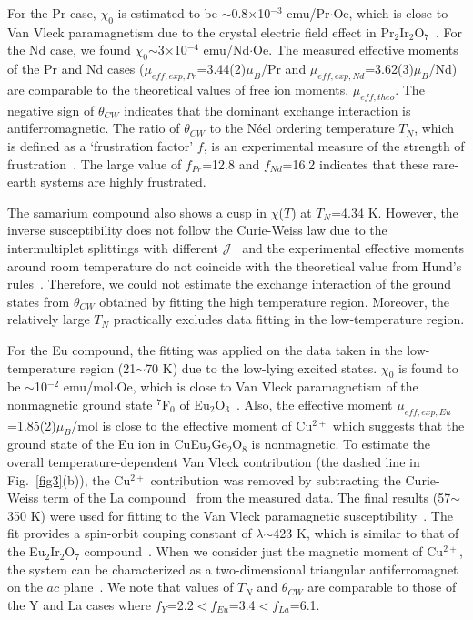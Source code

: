 \documentclass[aps,prl,reprint,amsmath,amssymb,superscriptaddress,showpacs]{revtex4-1}
\begin{document}
For the Pr case, $\chi_0$ is estimated to be $\sim$0.8$\times$10$^{-3}$ emu/Pr$\cdot$Oe, which is close to Van Vleck paramagnetism due to the crystal electric field effect in Pr$_2$Ir$_2$O$_7$~\cite{S.Nakatsuji2006}. For the Nd case, we found $\chi_0$$\sim$3$\times$10$^{-4}$ emu/Nd$\cdot$Oe. The measured effective moments of the Pr and Nd cases ($\mu_{eff,exp,Pr}$=3.44(2)$\mu_{B}$/Pr and $\mu_{eff,exp,Nd}$=3.62(3)$\mu_{B}$/Nd)  are comparable to the theoretical values of free ion moments, $\mu_{eff,theo}$. The negative sign of $\theta_{CW}$ indicates that the dominant exchange interaction is antiferromagnetic. The ratio of $\theta_{CW}$ to the N\'eel ordering temperature $T_N$, which is defined as a `frustration factor' $f$, is an experimental measure of the strength of frustration~\cite{A.Ramirez1994}. The large value of $f_{Pr}$=12.8 and $f_{Nd}$=16.2 indicates that these rare-earth systems are highly frustrated.  

The samarium compound also shows a cusp in $\chi$($T$) at $T_N$=4.34 K. However, the inverse susceptibility does not follow the Curie-Weiss law due to the intermultiplet splittings with different $\mathcal{J}$~\cite{S.Singh2008,J.pospisil2010} and the experimental effective moments around room temperature do not coincide with the theoretical value from Hund's rules~\cite{S.Blundell2001}. Therefore, we could not estimate the exchange interaction of the ground states from $\theta_{CW}$ obtained by fitting the high temperature region. Moreover, the relatively large $T_N$ practically excludes data fitting in the low-temperature region.

For the Eu compound, the fitting was applied on the data taken in the low-temperature region (21$\sim$70 K) due to the low-lying excited states. $\chi_0$ is found to be $\sim$10$^{-2}$ emu/mol$\cdot$Oe, which is close to Van Vleck paramagnetism of the nonmagnetic ground state $^7$F$_0$ of Eu$_2$O$_3$~\cite{A.S.Borovik1956}. Also, the effective moment $\mu_{eff,exp,Eu}$=1.85(2)$\mu_{B}$/mol is close to the effective moment of Cu$^{2+}$ which suggests that the ground state of the Eu ion in CuEu$_2$Ge$_2$O$_8$ is nonmagnetic. To estimate the overall temperature-dependent Van Vleck contribution (the dashed line in Fig.~\ref{fig3}(b)), the Cu$^{2+}$ contribution was removed by subtracting the Curie-Weiss term of the La compound~\cite{H.Cho2017} from the measured data. The final results (57$\sim$350 K) were used for fitting to the Van Vleck paramagnetic susceptibility~\cite{Y.Takikawa2010}. The fit provides a spin-orbit couping constant of $\lambda$$\sim$423 K, which is similar to that of the Eu$_2$Ir$_2$O$_7$ compound~\cite{J.Ishikawa2012}.  
When we consider just the magnetic moment of Cu$^{2+}$, the system can be characterized as a two-dimensional triangular antiferromagnet on the $ac$ plane~\cite{H.Cho2017}. We note that values of $T_N$ and $\theta_{CW}$ are comparable to those of the Y and La cases where $f_{Y}$=2.2$<$$f_{Eu}$=3.4$<$$f_{La}$=6.1.
\end{document}

